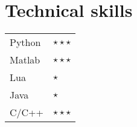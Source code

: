 \documentclass[11pt,a4paper,sans]{moderncv}
\begin{document}
\section{Technical skills} %

\cvitem{}
{
\hspace{10mm}\begin{tabular}{p{5cm}l}
Python & $\star\star\star$ \\
Matlab & $\star\star\star$\\
Lua & $\star$ \\
Java & $\star$ \\
C/C++ & $\star\star\star$ \\
\end{tabular}
\linebreak
}
\end{document}
